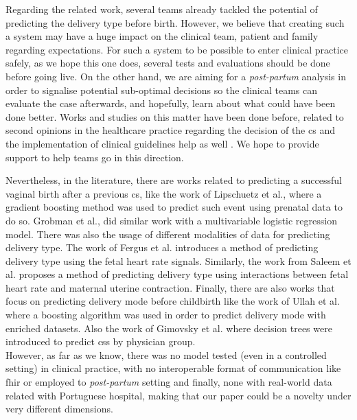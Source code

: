 Regarding the related work, several teams already tackled the potential of predicting the delivery type before birth. However, we believe that creating such a system may have a huge impact on the clinical team, patient and family regarding expectations. For such a system to be possible to enter clinical practice safely, as we hope this one does, several tests and evaluations should be done before going live.
On the other hand, we are aiming for a \textit{post-partum} analysis in order to signalise potential sub-optimal decisions so the clinical teams can evaluate the case afterwards, and hopefully, learn about what could have been done better.
Works and studies on this matter have been done before, related to second opinions in the healthcare practice regarding the decision of the \ac{cs} \cite{mandatorysecondopinion} and the implementation of clinical guidelines help as well \cite{reducingcaeresan}. We hope to provide support to help teams go in this direction.

Nevertheless, in the literature, there are works related to predicting a successful vaginal birth after a previous \ac{cs}, like the work of Lipschuetz et al., \cite{lipschuetzPredictionVaginalBirth2020} where a gradient boosting method was used to predict such event using prenatal data to do so. Grobman et al., \cite{grobman_development_2007} did similar work with a multivariable logistic regression model.
There was also the usage of different modalities of data for predicting delivery type. The work of Fergus et al. \cite{fergusClassificationCaesareanSection2017} introduces a method of predicting delivery type using the fetal heart rate signals. Similarly, the work from Saleem et al. \cite{saleemStrategyClassificationVaginal2019a} proposes a method of predicting delivery type using interactions between fetal heart rate and maternal uterine contraction.
Finally, there are also works that focus on predicting delivery mode before childbirth like the work of Ullah et al. \cite{ullah_reliable_2021} where a boosting algorithm was used in order to predict delivery mode with enriched datasets. Also the work of Gimovsky et al. \cite{gimovskyBenchmarkingCesareanDelivery} where decision trees were introduced  to predict \acp{cs} by physician group. \\
However, as far as we know, there was no model tested (even in a controlled setting) in clinical practice, with no interoperable format of communication like \ac{fhir} or employed to \textit{post-partum} setting and finally, none with real-world data related with Portuguese hospital, making that our paper could be a novelty under very different dimensions.




